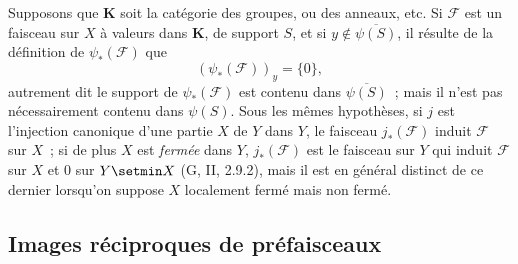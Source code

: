 \begin{env}[3.4.6]
\label{0.3.4.6-fr}
Supposons que $\boldsymbol{K}$ soit la catégorie des groupes, ou des anneaux, etc.
Si $\mathcal{F}$ est un faisceau sur $X$ à valeurs dans $\boldsymbol{K}$, de
support $S$, et si $y\notin\overline{\psi(S)}$, il résulte de la définition de
$\psi_*(\mathcal{F})$ que
\[
  (\psi_*(\mathcal{F}))_y=\{0\},
\]
autrement dit le support de $\psi_*(\mathcal{F})$ est contenu dans
$\overline{\psi(S)}$~; mais il n'est pas nécessairement contenu dans
$\psi(S)$. Sous les mêmes hypothèses, si $j$ est l'injection canonique d'une
partie $X$ de $Y$ dans $Y$, le faisceau $j_*(\mathcal{F})$ induit
$\mathcal{F}$ sur $X$~; si de plus $X$ est \emph{fermée} dans $Y$,
$j_*(\mathcal{F})$ est le faisceau sur $Y$ qui induit $\mathcal{F}$ sur $X$
et $0$ sur $Y\setmin X$ (G, II, 2.9.2), mais il est en général distinct de ce dernier
lorsqu'on suppose $X$ localement fermé mais non fermé.
\end{env}
 
\subsection{Images réciproques de préfaisceaux}

